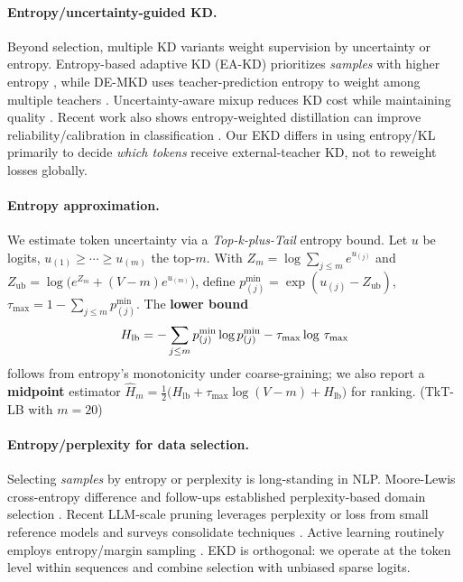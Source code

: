 \documentclass[11pt]{article}
\begin{document}
\paragraph{Entropy/uncertainty-guided KD.} Beyond selection, multiple KD variants weight supervision by uncertainty or entropy. Entropy-based adaptive KD (EA-KD) prioritizes \emph{samples} with higher entropy \citep{su2023eakd}, while DE-MKD uses teacher-prediction entropy to weight among multiple teachers \citep{cheng2024demkd}. Uncertainty-aware mixup reduces KD cost while maintaining quality \citep{xu2023unix}. Recent work also shows entropy-weighted distillation can improve reliability/calibration in classification \citep{guo2024entropykd}. Our EKD differs in using entropy/KL primarily to decide \emph{which tokens} receive external-teacher KD, not to reweight losses globally.

\paragraph{Entropy approximation.} We estimate token uncertainty via a \emph{Top-k-plus-Tail} entropy bound\citep{kaltchenko2025entropyheatmap}. Let $u$ be logits, $u_{(1)} \geq \cdots \geq u_{(m)}$ the top-$m$. With $Z_m = \log \sum_{j \leq m} e^{u_{(j)}}$ and $Z_{\text{ub}} = \log\big(e^{Z_m} + (V-m)e^{u_{(m)}}\big)$, define $p^{\min}_{(j)} = \exp(u_{(j)} - Z_{\text{ub}})$, $\tau_{\max} = 1 - \sum_{j \leq m} p^{\min}_{(j)}$. The \textbf{lower bound}
\[\small
H_{\text{lb}} = -\sum_{j \leq m} p^{\min}_{(j)} \log p^{\min}_{(j)} - \tau_{\max} \log \, \tau_{\max}
\]
follows from entropy's monotonicity under coarse-graining; we also report a \textbf{midpoint} estimator $\widehat{H}_m = \tfrac{1}{2}\big(H_{\text{lb}} + \tau_{\max} \log(V-m) + H_{\text{lb}}\big)$ for ranking. (TkT-LB with $m=20$)

\paragraph{Entropy/perplexity for data selection.} Selecting \emph{samples} by entropy or perplexity is long-standing in NLP. Moore-Lewis cross-entropy difference and follow-ups established perplexity-based domain selection \citep{moore2010cediff,axelrod2015few,axelrod2017cynical}. Recent LLM-scale pruning leverages perplexity or loss from small reference models \citep{ankner2022perplexprune} and surveys consolidate techniques \citep{datasel2024survey}. Active learning routinely employs entropy/margin sampling \citep{zhang2022alsurvey}. EKD is orthogonal: we operate at the token level within sequences and combine selection with unbiased sparse logits.
\end{document}
